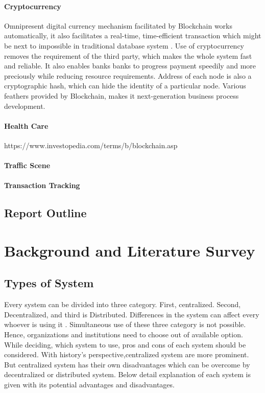 \documentclass[a4paper,twoside,12pt]{report}
\begin{document}
\begin{spacing}{1.5}
\subsubsection{Cryptocurrency}
Omnipresent digital currency mechanism facilitated by Blockchain works automatically, it also facilitates a real-time, time-efficient transaction which might be next to impossible in traditional database system \cite{overviewofblockchainsecurity,democraticmininginbitcoins}. Use of cryptocurrency removes the requirement of the third party, which makes the whole system fast and reliable. It also enables banks banks to progress payment speedily and more preciously while reducing resource requirements.
Address of each node is also a cryptographic hash, which can hide the identity of a particular node.  Various feathers provided by Blockchain, makes it next-generation business process development.
\subsubsection{Health Care}
https://www.investopedia.com/terms/b/blockchain.asp
\subsubsection{Traffic Scene}
\subsubsection{Transaction Tracking}
\section{Report Outline}
\chapter{Background and Literature Survey}
\section{Types of System}
Every system can be divided into three category. First, centralized. Second, Decentralized, and third is Distributed. Differences in the system can affect every whoever is using it \cite{gfg_cent_vs_decent}. Simultaneous use of these three category is not possible. Hence, organizations and institutions need to choose out of available option. While deciding, which system to use, pros and cons of each system should be considered. With history's perspective,centralized system are more prominent. But centralized system has their own disadvantages which can be overcome by decentralized or distributed system. Below detail explanation of each system is given with its potential advantages and disadvantages.

\end{spacing}
\end{document}
